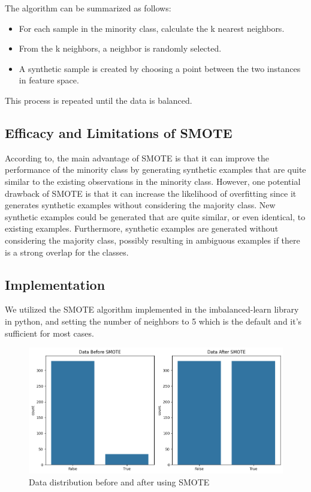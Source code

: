 \documentclass[12pt]{report}
\begin{document}
The algorithm can be summarized as follows:
\begin{itemize}
      \item For each sample in the minority class, calculate the k nearest neighbors.
      \item From the k neighbors, a neighbor is randomly selected.
      \item A synthetic sample is created by choosing a point between the two instances in
            feature space.
\end{itemize}

This process is repeated until the data is balanced.

\subsection*{Efficacy and Limitations of SMOTE}

According to\cite{fernandez2018smote}, the main advantage of SMOTE is that it
can improve the performance of the minority class by generating synthetic
examples that are quite similar to the existing observations in the minority
class. However, one potential drawback of SMOTE is that it can increase the
likelihood of overfitting since it generates synthetic examples without
considering the majority class. New synthetic examples could be generated that
are quite similar, or even identical, to existing examples. Furthermore,
synthetic examples are generated without considering the majority class,
possibly resulting in ambiguous examples if there is a strong overlap for the
classes.

\subsection*{Implementation}
We utilized the SMOTE algorithm implemented in the imbalanced-learn library in
python, and setting the number of neighbors to 5 which is the default and it's
sufficient for most cases.

\begin{figure}[ht]
      \centering
      \includegraphics[width=\textwidth]{./figures/Imbalanced_vs_balanced.png}
      \caption{Data distribution before and after using SMOTE}
      \label{fig:smote_plot}
\end{figure}
\end{document}
